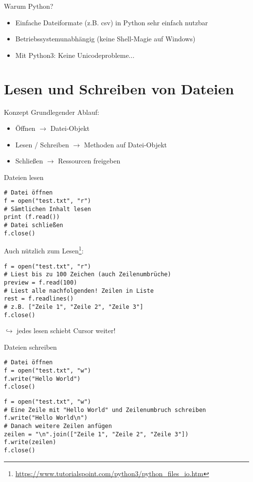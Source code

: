\begin{frame}{Warum Python?}
	\begin{itemize}
        \item Einfache Dateiformate (z.B. csv) in Python sehr einfach nutzbar
        \item Betriebssystemunabhängig (keine Shell-Magie auf Windows)
        \item Mit Python3: Keine Unicodeprobleme...
	\end{itemize}
\end{frame}

\section{Lesen und Schreiben von Dateien}

\begin{frame}{Konzept}
	Grundlegender Ablauf:
    \begin{itemize}
        \item Öffnen $\rightarrow$ Datei-Objekt
        \item Lesen / Schreiben $\rightarrow$ Methoden auf Datei-Objekt
        \item Schließen $\rightarrow$ Ressourcen freigeben
    \end{itemize}
\end{frame}

\begin{frame}[fragile]{Dateien lesen}
    \begin{lstlisting}
# Datei öffnen
f = open("test.txt", "r")
# Sämtlichen Inhalt lesen
print (f.read())
# Datei schließen
f.close()\end{lstlisting}
    Auch nützlich zum Lesen\footnote{\url{https://www.tutorialspoint.com/python3/python_files_io.htm}}:
    \begin{lstlisting}
f = open("test.txt", "r")
# Liest bis zu 100 Zeichen (auch Zeilenumbrüche)
preview = f.read(100)
# Liest alle nachfolgenden! Zeilen in Liste
rest = f.readlines()
# z.B. ["Zeile 1", "Zeile 2", "Zeile 3"]
f.close()\end{lstlisting}
    $\hookrightarrow$ jedes lesen schiebt Cursor weiter!
\end{frame}

\begin{frame}[fragile]{Dateien schreiben}
    \begin{lstlisting}
# Datei öffnen
f = open("test.txt", "w")
f.write("Hello World")
f.close()
    \end{lstlisting}
    \begin{lstlisting}
f = open("test.txt", "w")
# Eine Zeile mit "Hello World" und Zeilenumbruch schreiben
f.write("Hello World\n")
# Danach weitere Zeilen anfügen
zeilen = "\n".join(["Zeile 1", "Zeile 2", "Zeile 3"])
f.write(zeilen)
f.close()
    \end{lstlisting}
\end{frame}




